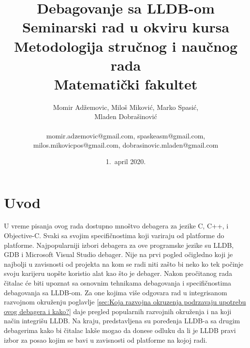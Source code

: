 \documentclass[a4paper]{article}
\begin{document}
\title{Debagovanje sa LLDB-om\\ \small{Seminarski rad u okviru kursa\\Metodologija stručnog i naučnog rada\\ Matematički fakultet}}

\author{Momir Adžemovic, Miloš Miković, Marko Spasić,\\ Mladen Dobrašinović\\ \\ \small momir.adzemovic@gmail.com, spaskeasm@gmail.com,\\ \small milos.mikovicpos@gmail.com, dobrasinovic.mladen@gmail.com}

\date{1.~april 2020.}

\maketitle


\tableofcontents

\newpage

\section{Uvod}
\label{sec:uvod}

U vreme pisanja ovog rada dostupno mnoštvo debagera za jezike C, C++, i Objective-C. Svaki sa svojim specifičnostima koji variraju od platforme do platforme. Najpopularniji izbori debagera za ove programske jezike su LLDB, GDB i Microsoft Visual Studio debager. Nije na prvi pogled očigledno koji je najbolji u zavisnosti od projekta na kom se radi niti zašto bi neko ko tek počinje svoju karijeru uopšte koristio alat kao što je debager.
Nakon pročitanog rada čitalac će biti upoznat sa osnovnim tehnikama debagovanja i specifičnostima debagovanja sa LLDB-om. Za one kojima više odgovara rad u integrisanom razvojnom okruženju poglavlje \ref{sec:Koja razvojna okruzenja podrzavaju upotrebu ovog debagera i kako?} daje pregled popularnih razvojnih okruženja i na koji način integrišu LLDB. Na kraju, predstavljena su poređenja LLDB-a sa drugim debagerima kako bi čitalac lakše mogao da donese odluku da li je LLDB pravi izbor za posao kojim se bavi u zavisnosti od platforme na kojoj radi. 
\end{document}
